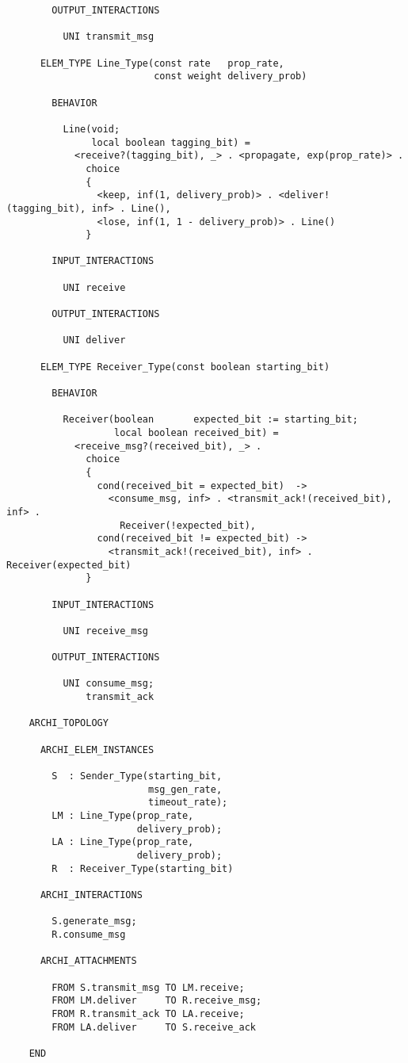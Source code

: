 \begin{verbatim}
        OUTPUT_INTERACTIONS

          UNI transmit_msg

      ELEM_TYPE Line_Type(const rate   prop_rate,
                          const weight delivery_prob)

        BEHAVIOR

          Line(void;
               local boolean tagging_bit) =
            <receive?(tagging_bit), _> . <propagate, exp(prop_rate)> .
              choice
              {
                <keep, inf(1, delivery_prob)> . <deliver!(tagging_bit), inf> . Line(),
                <lose, inf(1, 1 - delivery_prob)> . Line()
              }

        INPUT_INTERACTIONS

          UNI receive

        OUTPUT_INTERACTIONS

          UNI deliver

      ELEM_TYPE Receiver_Type(const boolean starting_bit)

        BEHAVIOR

          Receiver(boolean       expected_bit := starting_bit;
                   local boolean received_bit) =
            <receive_msg?(received_bit), _> .
              choice
              {
                cond(received_bit = expected_bit)  ->
                  <consume_msg, inf> . <transmit_ack!(received_bit), inf> .
                    Receiver(!expected_bit),
                cond(received_bit != expected_bit) ->
                  <transmit_ack!(received_bit), inf> . Receiver(expected_bit)
              }

        INPUT_INTERACTIONS

          UNI receive_msg

        OUTPUT_INTERACTIONS

          UNI consume_msg;
              transmit_ack

    ARCHI_TOPOLOGY

      ARCHI_ELEM_INSTANCES

        S  : Sender_Type(starting_bit,
                         msg_gen_rate,
                         timeout_rate);
        LM : Line_Type(prop_rate,
                       delivery_prob);
        LA : Line_Type(prop_rate,
                       delivery_prob);
        R  : Receiver_Type(starting_bit)

      ARCHI_INTERACTIONS

        S.generate_msg;
        R.consume_msg

      ARCHI_ATTACHMENTS

        FROM S.transmit_msg TO LM.receive;
        FROM LM.deliver     TO R.receive_msg;
        FROM R.transmit_ack TO LA.receive;
        FROM LA.deliver     TO S.receive_ack

    END
	\end{verbatim}

